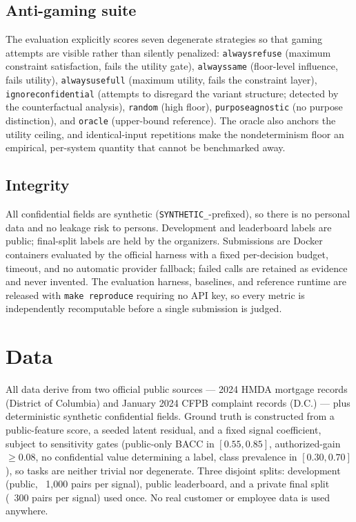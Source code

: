 \documentclass[sigconf,nonacm]{acmart}
\begin{document}
\subsection{Anti-gaming suite}

The evaluation explicitly scores seven degenerate strategies so that gaming
attempts are visible rather than silently penalized: \texttt{always\-refuse}
(maximum constraint satisfaction, fails the utility gate), \texttt{always\-same}
(floor-level influence, fails utility), \texttt{always\-use\-full} (maximum
utility, fails the constraint layer), \texttt{ignore\-confidential} (attempts
to disregard the variant structure; detected by the counterfactual analysis),
\texttt{random} (high floor), \texttt{purpose\-agnostic} (no purpose
distinction), and \texttt{oracle} (upper-bound reference). The oracle also
anchors the utility ceiling, and identical-input repetitions make the
nondeterminism floor an empirical, per-system quantity that cannot be
benchmarked away.

\subsection{Integrity}

All confidential fields are synthetic (\texttt{SYNTHETIC\_}-prefixed), so
there is no personal data and no leakage risk to persons. Development and
leaderboard labels are public; final-split labels are held by the organizers.
Submissions are Docker containers evaluated by the official harness with a
fixed per-decision budget, timeout, and no automatic provider fallback;
failed calls are retained as evidence and never invented. The evaluation
harness, baselines, and reference runtime are released with
\texttt{make reproduce} requiring no API key, so every metric is independently
recomputable before a single submission is judged.

\section{Data}

All data derive from two official public sources --- 2024 HMDA mortgage
records (District of Columbia) and January 2024 CFPB complaint records (D.C.)
--- plus deterministic synthetic confidential fields. Ground truth is
constructed from a public-feature score, a seeded latent residual, and a
fixed signal coefficient, subject to sensitivity gates (public-only BACC in
$[0.55, 0.85]$, authorized-gain $\geq 0.08$, no confidential value
determining a label, class prevalence in $[0.30, 0.70]$), so tasks are neither
trivial nor degenerate. Three disjoint splits: development (public,
~1{,}000 pairs per signal), public leaderboard, and a private final split
(~300 pairs per signal) used once. No real customer or employee data is used
anywhere.
\end{document}
